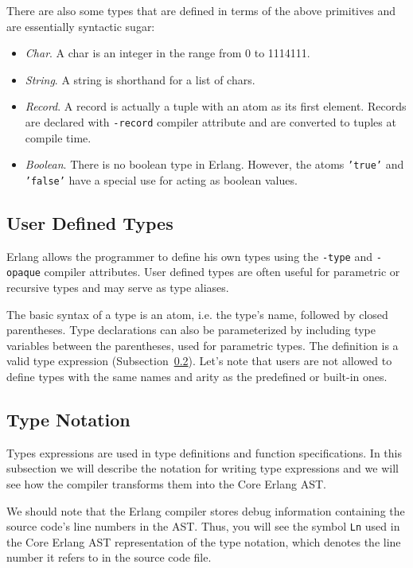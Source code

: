 There are also some types that are defined in terms of the above primitives and
are essentially syntactic sugar:

\begin{itemize}
  \item \emph{Char}. A char is an integer in the range from 0 to 1114111.
  \item \emph{String}. A string is shorthand for a list of chars.
  \item \emph{Record}. A record is actually a tuple with an atom as its first
    element. Records are declared with \texttt{-record} compiler attribute and
    are converted to tuples at compile time.
  \item \emph{Boolean}. There is no boolean type in Erlang. However, the atoms
    \texttt{'true'} and \texttt{'false'} have a special use for acting as
    boolean values.
\end{itemize}

\subsection{User Defined Types}\label{sub:userdef_types}

Erlang allows the programmer to define his own types using the \texttt{-type}
and \texttt{-opaque} compiler attributes. User defined types are often useful
for parametric or recursive types and may serve as type aliases.

The basic syntax of a type is an atom, i.e. the type's name, followed by closed
parentheses. Type declarations can also be parameterized by including type
variables between the parentheses, used for parametric types. The definition is
a valid type expression (Subsection~\ref{sub:type_notation}). Let's note that
users are not allowed to define types with the same names and arity as the
predefined or built-in ones.

\subsection{Type Notation}\label{sub:type_notation}

Types expressions are used in type definitions and function specifications. In
this subsection we will describe the notation for writing type expressions and
we will see how the compiler transforms them into the Core Erlang AST.

We should note that the Erlang compiler stores debug information containing the
source code's line numbers in the AST. Thus, you will see the symbol
\texttt{Ln} used in the Core Erlang AST representation of the type notation,
which denotes the line number it refers to in the source code file.


